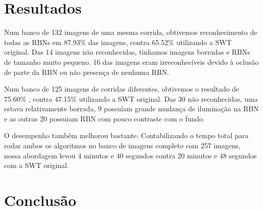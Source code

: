\documentclass[10pt,twocolumn,letterpaper]{article}
\begin{document}
\section{Resultados}

Num banco de 132 imagens de uma mesma corrida, obtivemos reconhecimento de todas as RBNs em 87.93\% das imagens, contra 65.52\% 
utilizando a SWT original. Das 14 imagens n\~ao reconhecidas, tinhamos imagens borradas e RBNs de tamanho muito pequeno. 16 das 
imagens eram irreconhec\'iveis devido \`a oclus\~ao de parte da RBN ou n\~ao presen\c{c}a de nenhuma RBN.

Num banco de 125 imagens de corridas diferentes, obtivemos o resultado de 75.60\% , contra 47.15\% utilizando a SWT original.
Das 30 n\~ao reconhecidas, uma estava relativamente borrada, 9 possu\'iam grande mudan\c{c}a de ilumina\c{c}\~ao na RBN e as outras 
20 possuiam RBN com pouco contraste com o fundo. 

O desempenho tamb\'em melhorou bastante. Contabilizando o tempo total para rodar ambos os algoritmos no banco de imagens completo 
com 257 imagens, nossa abordagem levou 4 minutos e 40 segundos contra 20 minutos e 48 segundos com a SWT original. 

\begin{table}[bp]
\centering
{}
\caption{Comparando nosso algoritmo com a SWT original.}
\label{my-label}
\end{table}

\section{Conclus\~ao}
\end{document}
